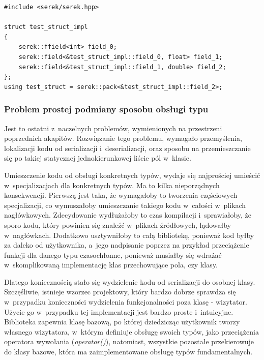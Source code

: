 \documentclass[12pt]{article}
\newcommand{\n}{\newline}
\newcommand{\code}[1]{{\it #1}}
\begin{document}
{{{				\begin{lstlisting}[frame=single]
#include <serek/serek.hpp>

struct test_struct_impl
{
	serek::ffield<int> field_0;
	serek::field<&test_struct_impl::field_0, float> field_1;
	serek::field<&test_struct_impl::field_1, double> field_2;
};
using test_struct = serek::pack<&test_struct_impl::field_2>;
				\end{lstlisting}
			}

			{
				\subsubsection{Problem prostej podmiany sposobu obsługi typu}

				Jest to ostatni z~naczelnych problemów, wymienionych na przestrzeni poprzednich akapitów. Rozwiązanie tego problemu,
				wymagało przemyślenia, lokalizacji kodu od serializacji i~deserializacji, oraz sposobu na przemieszczanie się po takiej
				statycznej jednokierunkowej liście pól w~klasie.\n

				Umieszczenie kodu od obsługi konkretnych typów, wydaje się najprościej umieścić w~specjalizacjach dla konkretnych typów.
				Ma to kilka nieporządnych konsekwencji. Pierwszą jest taka, że wymagałoby to tworzenia częściowych specjalizacji, co
				wymuszałoby umieszczanie takiego kodu w~całości w~plikach nagłówkowych. Zdecydowanie wydłużałoby to czas kompilacji
				i~sprawiałoby, że sporo kodu, który powinien się znaleźć w~plikach źródłowych, lądowałby w~nagłówkach. Dodatkowo
				usztywniłoby to całą bibliotekę, ponieważ kod byłby za daleko od użytkownika, a~jego nadpisanie poprzez na przykład
				przeciążenie funkcji dla danego typu czasochłonne, ponieważ musiałby się wdrażać w~skomplikowaną implementację klas
				przechowujące pola, czy klasy.\n

				Dlatego koniecznością stało się wydzielenie kodu od serializacji do osobnej klasy. Szczęśliwie, istnieje wzorzec projektowy,
				który bardzo dobrze sprawdza się w~przypadku konieczności wydzielenia funkcjonalności poza klasę - wizytator\cite{visitor_description}.
				Użycie go w~przypadku tej implementacji jest bardzo proste i~intuicyjne. Biblioteka zapewnia klasę bazową, po której dziedzicząc
				użytkownik tworzy własnego wizytatora, w~którym definiuje obsługę swoich typów, jako przeciążenia operatora wywołania (\code{operator()}),
				natomiast, wszystkie pozostałe przekierowuje do klasy bazowe, która ma zaimplementowane obsługę typów fundamentalnych.\n

}}}
\end{document}
